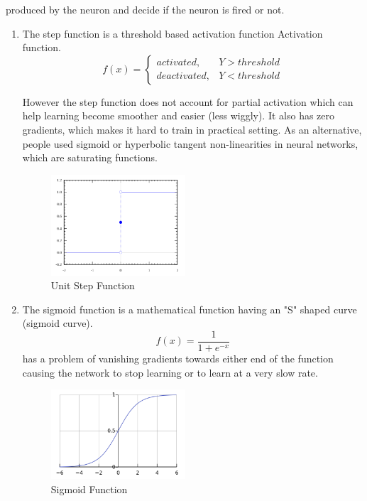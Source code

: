 produced by the neuron and decide if the neuron is fired or not. 
\begin{enumerate}[label=(\alph*)]
\item The step function is a threshold based activation function Activation function. 
\begin{equation}
    f(x)=\begin{cases}
            activated, & Y > threshold\\
            deactivated, & Y < threshold
        \end{cases}
\end{equation}

However the step function does not account for partial activation which can help learning become smoother and easier (less wiggly). It also has zero gradients, which makes it hard to train in practical setting. As an alternative, people used sigmoid or hyperbolic tangent non-linearities in neural networks, which are saturating functions. 
\begin{figure}[ht]
\centering
\includegraphics[width=50mm]{lectures/02-b/step_function.png}
\caption{Unit Step Function}
\label{fig:step_function}
\end{figure}

\item The sigmoid function is a mathematical function having an "S" shaped curve (sigmoid curve).
\begin{equation}
    f(x) = \frac{1}{1+e^{-x}}
\end{equation}
has a problem of vanishing gradients towards either end of the function causing the network to stop learning or to learn at a very slow rate.

\begin{figure}[ht]
\centering
\includegraphics[width=50mm]{lectures/02-b/sigmoid_function.png}
\caption{Sigmoid Function}
\label{fig:sigmoid}
\end{figure}


\end{enumerate}
